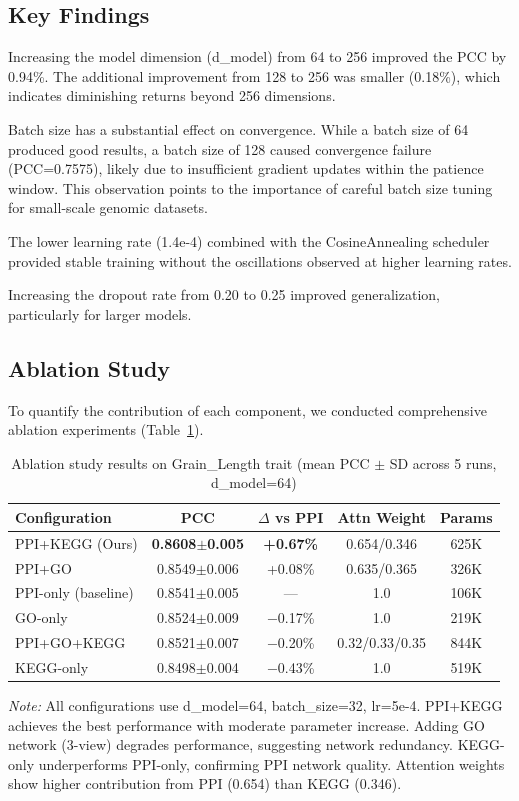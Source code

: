 \documentclass[11pt,a4paper]{article}
\begin{document}
\subsection{Key Findings}
\label{subsec:findings}

Increasing the model dimension (d\_model) from 64 to 256 improved the PCC by 0.94\%. The additional improvement from 128 to 256 was smaller (0.18\%), which indicates diminishing returns beyond 256 dimensions.

Batch size has a substantial effect on convergence. While a batch size of 64 produced good results, a batch size of 128 caused convergence failure (PCC=0.7575), likely due to insufficient gradient updates within the patience window. This observation points to the importance of careful batch size tuning for small-scale genomic datasets.

The lower learning rate (1.4e-4) combined with the CosineAnnealing scheduler provided stable training without the oscillations observed at higher learning rates.

Increasing the dropout rate from 0.20 to 0.25 improved generalization, particularly for larger models.

\subsection{Ablation Study}
\label{subsec:ablation}

To quantify the contribution of each component, we conducted comprehensive ablation experiments (Table~\ref{tab:ablation}).

\begin{table}[H]
\centering
\caption{Ablation study results on Grain\_Length trait (mean PCC $\pm$ SD across 5 runs, d\_model=64)}
\label{tab:ablation}
\begin{tabular}{lcccc}
\toprule
\textbf{Configuration} & \textbf{PCC} & \textbf{$\Delta$ vs PPI} & \textbf{Attn Weight} & \textbf{Params} \\
\midrule
PPI+KEGG (Ours) & \textbf{0.8608$\pm$0.005} & \textbf{+0.67\%} & 0.654/0.346 & 625K \\
PPI+GO & 0.8549$\pm$0.006 & +0.08\% & 0.635/0.365 & 326K \\
PPI-only (baseline) & 0.8541$\pm$0.005 & — & 1.0 & 106K \\
GO-only & 0.8524$\pm$0.009 & $-$0.17\% & 1.0 & 219K \\
PPI+GO+KEGG & 0.8521$\pm$0.007 & $-$0.20\% & 0.32/0.33/0.35 & 844K \\
KEGG-only & 0.8498$\pm$0.004 & $-$0.43\% & 1.0 & 519K \\
\bottomrule
\end{tabular}
\begin{flushleft}
\footnotesize \textit{Note:} All configurations use d\_model=64, batch\_size=32, lr=5e-4. PPI+KEGG achieves the best performance with moderate parameter increase. Adding GO network (3-view) degrades performance, suggesting network redundancy. KEGG-only underperforms PPI-only, confirming PPI network quality. Attention weights show higher contribution from PPI (0.654) than KEGG (0.346).
\end{flushleft}
\end{table}
\end{document}

